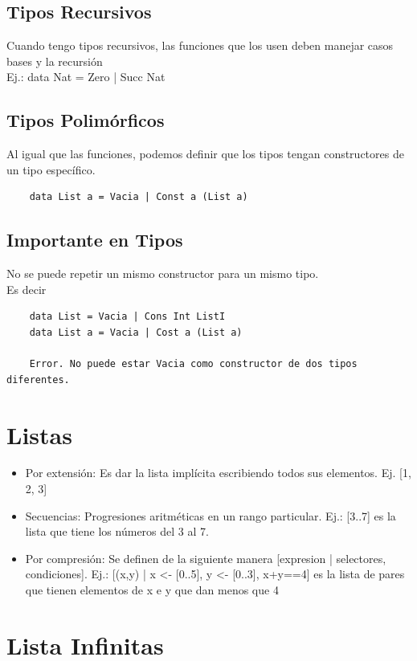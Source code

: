 \documentclass[10pt,a4paper]{article}
\begin{document}
\subsection*{Tipos Recursivos}
Cuando tengo tipos recursivos, las funciones que los usen deben manejar casos bases y la recursión \\
Ej.: data Nat = Zero | Succ Nat 
\subsection*{Tipos Polimórficos} 
Al igual que las funciones, podemos definir que los tipos tengan constructores de un tipo específico.
\begin{lstlisting}
    data List a = Vacia | Const a (List a)
\end{lstlisting}
\subsection*{Importante en Tipos}
No se puede repetir un mismo constructor para un mismo tipo. \\
Es decir
\begin{lstlisting}
    data List = Vacia | Cons Int ListI 
    data List a = Vacia | Cost a (List a)

    Error. No puede estar Vacia como constructor de dos tipos diferentes.
\end{lstlisting}
\section*{Listas}
\begin{itemize}
    \item Por extensión: Es dar la lista implícita escribiendo todos sus elementos. Ej. [1, 2, 3]
    \item Secuencias: Progresiones aritméticas en un rango particular. Ej.: [3..7] es la lista que tiene los números del 3 al 7.
    \item Por compresión: Se definen de la siguiente manera [expresion | selectores, condiciones]. Ej.: [(x,y) | x <- [0..5], y <- [0..3], x+y==4] es la lista de pares que tienen elementos de x e y que dan menos que 4
\end{itemize}
\section*{Lista Infinitas}
\end{document}

